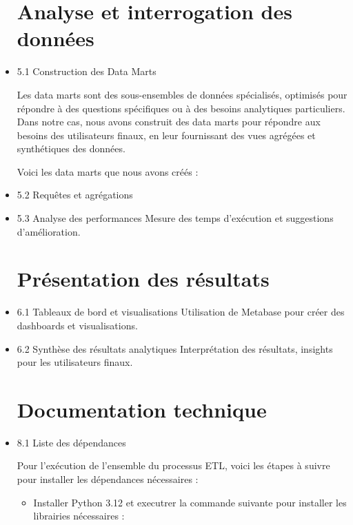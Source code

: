 \begin{itemize}
\chapter*{Analyse et interrogation des données}

\item 5.1 Construction des Data Marts

Les data marts sont des sous-ensembles de données spécialisés, optimisés pour répondre à des questions spécifiques ou à des besoins analytiques particuliers.
Dans notre cas, nous avons construit des data marts pour répondre aux besoins des utilisateurs finaux, en leur fournissant des vues agrégées et synthétiques des données.

Voici les data marts que nous avons créés :



\item 5.2 Requêtes et agrégations



\item 5.3 Analyse des performances
Mesure des temps d’exécution et suggestions d’amélioration.


\chapter*{Présentation des résultats}


\item 6.1 Tableaux de bord et visualisations
Utilisation de Metabase pour créer des dashboards et visualisations.


\item 6.2 Synthèse des résultats analytiques
Interprétation des résultats, insights pour les utilisateurs finaux.



\chapter*{Documentation technique}



\item 8.1 Liste des dépendances

Pour l’exécution de l'ensemble du processus ETL, voici les étapes à suivre pour installer les dépendances nécessaires :

\begin{itemize}
\item Installer Python 3.12 et executrer la commande suivante pour installer les librairies nécessaires :


\end{itemize}
\end{itemize}
